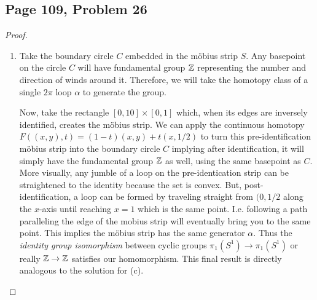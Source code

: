 \subsection*{Page 109, Problem 26}
\vspace{15pt}
\begin{proof}
    \vspace{-10pt}
    \begin{enumerate}[label = (\alph*)]
        \item Take the boundary circle $C$ embedded in the möbius strip $S$. Any basepoint on the circle $C$ will have fundamental group $\mathbb{Z}$ representing the number and direction of winds around it. Therefore, we will take the homotopy class of a single $2\pi$ loop $\alpha$ to generate the group. 
        
        Now, take the rectangle $[0,10] \times [0,1]$ which, when its edges are inversely identified, creates the möbius strip. We can apply the continuous homotopy $F((x,y),t) = (1-t)(x,y) + t(x,1/2)$ to turn this pre-identification möbius strip into the boundary circle $C$ implying after identification, it will simply have the fundamental group $\mathbb{Z}$ as well, using the same basepoint as $C$. More visually, any jumble of a loop on the pre-identication strip can be straightened to the identity because the set is convex. But, post-identification, a loop can be formed by traveling straight from $(0,1/2$ along the $x$-axis until reaching $x=1$ which is the same point. I.e. following a path paralleling the edge of the mobius strip will eventually bring you to the same point. This implies the möbius strip has the same generator $\alpha$. Thus the \emph{identity group isomorphism} between cyclic groups $\pi_1(S^1) \to \pi_1(S^1)$ or really $\mathbb{Z}\to\mathbb{Z}$ satisfies our homomorphism. This final result is directly analogous to the solution for (c).


\end{enumerate}
\end{proof}

